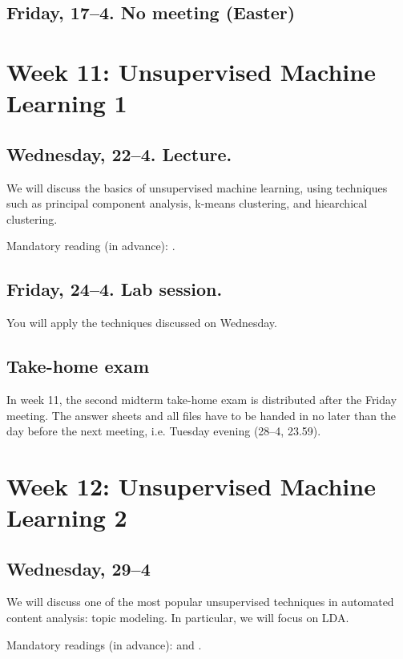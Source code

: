 \subsection*{Friday, 17--4. No meeting (Easter)}




\section*{Week 11: Unsupervised Machine Learning 1}

\subsection*{Wednesday, 22--4. Lecture.}
We will discuss the basics of unsupervised machine learning, using techniques such as principal component analysis, k-means clustering, and hiearchical clustering.

Mandatory reading (in advance): \cite{burscher2016}.

\subsection*{Friday, 24--4. Lab session.}
You will apply the techniques discussed on Wednesday.


\subsection*{Take-home exam}
In week 11, the second midterm take-home exam is distributed after the Friday meeting. The answer sheets and all files have to be handed in no later than the day before the next meeting, i.e. Tuesday evening (28--4, 23.59).






\section*{Week 12: Unsupervised Machine Learning 2}


\subsection*{Wednesday, 29--4}
We will discuss one of the most popular unsupervised techniques in automated content analysis: topic modeling. In particular, we will focus on LDA.

Mandatory readings (in advance): \cite{Maier2018a} and \cite{Tsur2015}. 

